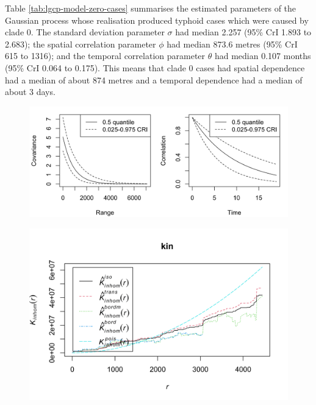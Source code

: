 \hspace*{0.2pt}

Table \ref{tab:lgcp-model-zero-cases} summarises the estimated parameters of the Gaussian process whose realisation produced typhoid cases which were caused by clade 0. The standard deviation parameter $\sigma$ had median 2.257 (95\% CrI 1.893 to 2.683); the spatial correlation parameter $\phi$ had median 873.6 metres (95\% CrI 615 to 1316); and the temporal correlation parameter $\theta$ had median 0.107 months (95\% CrI 0.064 to 0.175). This means that clade 0 cases had spatial dependence had a median of about 874 metres and a temporal dependence had a median of about 3 days.

\begin{figure}[H]
    \begin{center}
        \includegraphics[scale=0.8]{Posterior Covariance Function - Major 0.png}
    \end{center}
     \label{fig:spatio-temporal-model-zero-cases}
\end{figure}

\begin{figure}[H]
    \begin{center}
        \includegraphics[scale=1]{Inhomogeneous K Function - Major 0.png}
    \end{center}
     \label{fig:k-function-zero-cases}
\end{figure}

